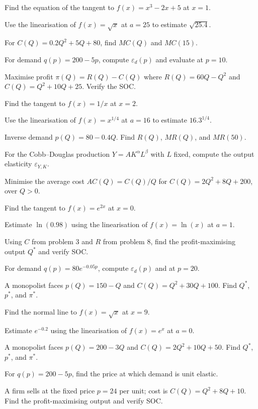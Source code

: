 \begin{problems}
  \item Find the equation of the tangent to $f(x)=x^3-2x+5$ at $x=1$.
  \item Use the linearisation of $f(x)=\sqrt{x}$ at $a=25$ to estimate
        $\sqrt{25.4}$.
  \item For $C(Q)=0.2Q^2+5Q+80$, find $MC(Q)$ and $MC(15)$.
  \item For demand $q(p)=200-5p$, compute $\varepsilon_d(p)$ and evaluate at
        $p=10$.
  \item Maximise profit $\pi(Q)=R(Q)-C(Q)$ where $R(Q)=60Q-Q^2$ and
        $C(Q)=Q^2+10Q+25$. Verify the SOC.
  \item Find the tangent to $f(x)=1/x$ at $x=2$.
  \item Use the linearisation of $f(x)=x^{1/4}$ at $a=16$ to estimate
        $16.3^{1/4}$.
  \item Inverse demand $p(Q)=80-0.4Q$. Find $R(Q)$, $MR(Q)$, and $MR(50)$.
  \item For the Cobb--Douglas production $Y=AK^\alpha L^\beta$ with $L$
        fixed, compute the output elasticity $\varepsilon_{Y,K}$.
  \item Minimise the average cost $AC(Q)=C(Q)/Q$ for
        $C(Q)=2Q^2+8Q+200$, over $Q>0$.
  \item Find the tangent to $f(x)=e^{2x}$ at $x=0$.
  \item Estimate $\ln(0.98)$ using the linearisation of $f(x)=\ln(x)$ at
        $a=1$.
  \item Using $C$ from problem 3 and $R$ from problem 8, find the
        profit-maximising output $Q^*$ and verify SOC.
  \item For demand $q(p)=80e^{-0.05p}$, compute $\varepsilon_d(p)$ and at
        $p=20$.
  \item A monopolist faces $p(Q)=150-Q$ and $C(Q)=Q^2+30Q+100$. Find $Q^*$,
        $p^*$, and $\pi^*$.
  \item Find the normal line to $f(x)=\sqrt{x}$ at $x=9$.
  \item Estimate $e^{-0.2}$ using the linearisation of $f(x)=e^x$ at $a=0$.
  \item A monopolist faces $p(Q)=200-3Q$ and $C(Q)=2Q^2+10Q+50$. Find
        $Q^*$, $p^*$, and $\pi^*$.
  \item For $q(p)=200-5p$, find the price at which demand is unit elastic.
  \item A firm sells at the fixed price $p=24$ per unit; cost is
        $C(Q)=Q^2+8Q+10$. Find the profit-maximising output and verify SOC.

\end{problems}
